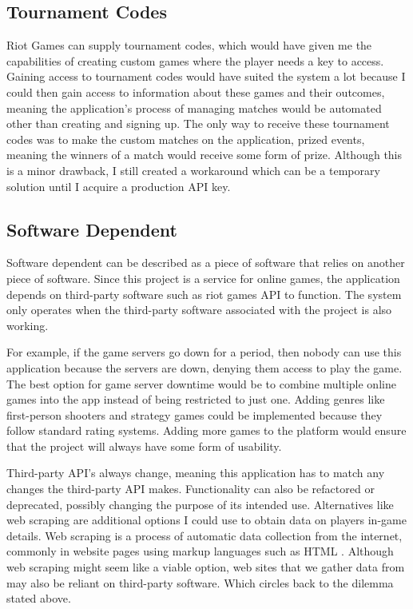 \subsection{Tournament Codes}
Riot Games can supply tournament codes, which would have given me the capabilities of creating custom games where the player needs a key to access. Gaining access to tournament codes would have suited the system a lot because I could then gain access to information about these games and their outcomes, meaning the application's process of managing matches would be automated other than creating and signing up. The only way to receive these tournament codes was to make the custom matches on the application, prized events, meaning the winners of a match would receive some form of prize. Although this is a minor drawback, I still created a workaround which can be a temporary solution until I acquire a production API key.
\subsection{Software Dependent}
Software dependent can be described as a piece of software that relies on another piece of software\cite{huang2007assessment}. Since this project is a service for online games, the application depends on third-party software such as riot games API to function. The system only operates when the third-party software associated with the project is also working. 

For example, if the game servers go down for a period, then nobody can use this application because the servers are down, denying them access to play the game. The best option for game server downtime would be to combine multiple online games into the app instead of being restricted to just one. Adding genres like first-person shooters and strategy games could be implemented because they follow standard rating systems. Adding more games to the platform would ensure that the project will always have some form of usability.\hfill \break

Third-party API's always change, meaning this application has to match any changes the third-party API makes. Functionality can also be refactored or deprecated, possibly changing the purpose of its intended use. \hfill \break
Alternatives like web scraping are additional options I could use to obtain data on players in-game details. Web scraping is a process of automatic data collection from the internet, commonly in website pages using markup languages such as HTML \cite{slamet2018web}. Although web scraping might seem like a viable option, web sites that we gather data from may also be reliant on third-party software. Which circles back to the dilemma stated above.
